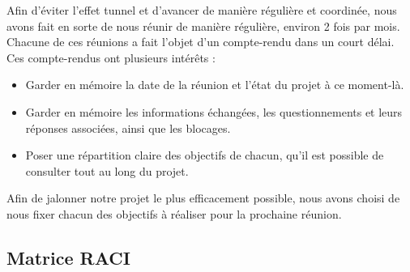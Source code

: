 \documentclass[11pt]{article}
\begin{document}
Afin d'éviter l'effet tunnel et d'avancer de manière régulière et coordinée, nous avons fait en sorte de nous réunir de manière régulière, environ 2 fois par mois.
Chacune de ces réunions a fait l'objet d'un compte-rendu dans un court délai. Ces compte-rendus ont plusieurs intérêts : 
\begin{itemize}
    \item Garder en mémoire la date de la réunion et l'état du projet à ce moment-là.
    \item Garder en mémoire les informations échangées, les questionnements et leurs réponses associées, ainsi que les blocages.
    \item Poser une répartition claire des objectifs de chacun, qu'il est possible de consulter tout au long du projet.
\end{itemize}

Afin de jalonner notre projet le plus efficacement possible, nous avons choisi de nous fixer chacun des objectifs à réaliser pour la prochaine réunion.
\subsection{Matrice RACI}
\end{document}
